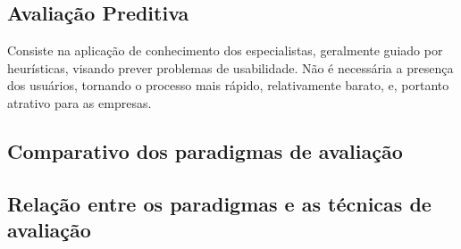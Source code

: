 \subsection{Avaliação Preditiva}

Consiste na aplicação de conhecimento dos especialistas, geralmente guiado por heurísticas, visando prever problemas de usabilidade. Não é necessária a presença dos usuários, tornando o processo mais rápido, relativamente barato, e, portanto atrativo para as empresas.


\subsection{Comparativo dos paradigmas de avaliação}

\subsection{Relação entre os paradigmas e as técnicas de avaliação}


